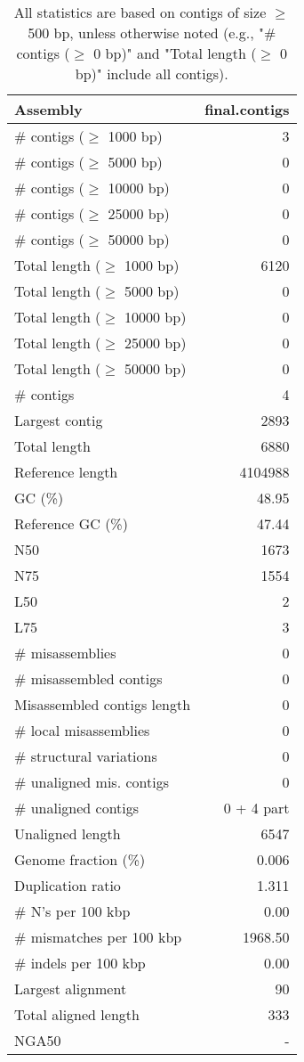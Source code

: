\documentclass[12pt,a4paper]{article}
\begin{document}
\begin{table}[ht]
\begin{center}
\caption{All statistics are based on contigs of size $\geq$ 500 bp, unless otherwise noted (e.g., "\# contigs ($\geq$ 0 bp)" and "Total length ($\geq$ 0 bp)" include all contigs).}
\begin{tabular}{|l*{1}{|r}|}
\hline
Assembly & final.contigs \\ \hline
\# contigs ($\geq$ 1000 bp) & 3 \\ \hline
\# contigs ($\geq$ 5000 bp) & 0 \\ \hline
\# contigs ($\geq$ 10000 bp) & 0 \\ \hline
\# contigs ($\geq$ 25000 bp) & 0 \\ \hline
\# contigs ($\geq$ 50000 bp) & 0 \\ \hline
Total length ($\geq$ 1000 bp) & 6120 \\ \hline
Total length ($\geq$ 5000 bp) & 0 \\ \hline
Total length ($\geq$ 10000 bp) & 0 \\ \hline
Total length ($\geq$ 25000 bp) & 0 \\ \hline
Total length ($\geq$ 50000 bp) & 0 \\ \hline
\# contigs & 4 \\ \hline
Largest contig & 2893 \\ \hline
Total length & 6880 \\ \hline
Reference length & 4104988 \\ \hline
GC (\%) & 48.95 \\ \hline
Reference GC (\%) & 47.44 \\ \hline
N50 & 1673 \\ \hline
N75 & 1554 \\ \hline
L50 & 2 \\ \hline
L75 & 3 \\ \hline
\# misassemblies & 0 \\ \hline
\# misassembled contigs & 0 \\ \hline
Misassembled contigs length & 0 \\ \hline
\# local misassemblies & 0 \\ \hline
\# structural variations & 0 \\ \hline
\# unaligned mis. contigs & 0 \\ \hline
\# unaligned contigs & 0 + 4 part \\ \hline
Unaligned length & 6547 \\ \hline
Genome fraction (\%) & 0.006 \\ \hline
Duplication ratio & 1.311 \\ \hline
\# N's per 100 kbp & 0.00 \\ \hline
\# mismatches per 100 kbp & 1968.50 \\ \hline
\# indels per 100 kbp & 0.00 \\ \hline
Largest alignment & 90 \\ \hline
Total aligned length & 333 \\ \hline
NGA50 & - \\ \hline
\end{tabular}
\end{center}
\end{table}
\end{document}
